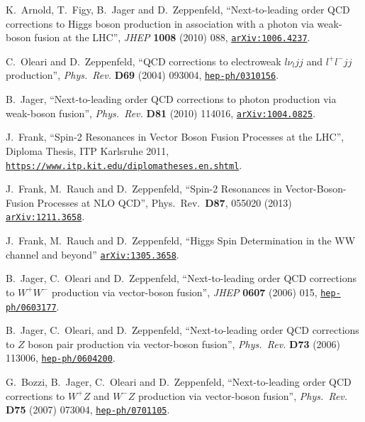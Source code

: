 \documentclass[english,12pt]{article}
\begin{document}
\begin{thebibliography}{10}
  K.~Arnold, T.~Figy, B.~Jager and D.~Zeppenfeld,
  ``Next-to-leading order QCD corrections to Higgs boson production in
  association with a photon via weak-boson fusion at the LHC'',
  {\em JHEP} {\bf 1008} (2010) 088,
\href{https://www.arXiv.org/abs/1006.4237}{{\tt arXiv:1006.4237}}.

C.~Oleari and D.~Zeppenfeld, ``QCD corrections to electroweak $l\nu_ljj$
and $l^+l^-jj$ production'', {\em Phys.\ Rev.} {\bf D69} (2004)
  093004,
\href{https://www.arXiv.org/abs/hep-ph/0310156}{{\tt hep-ph/0310156}}.

  B.~Jager,
  ``Next-to-leading order QCD corrections to photon production via weak-boson
  fusion'',
  {\em Phys.\ Rev.} {\bf D81} (2010) 114016,
 \href{https://arxiv.org/abs/1004.0825}{{\tt arXiv:1004.0825}}. 
  
J.~Frank, ``Spin-2 Resonances in Vector Boson Fusion Processes at the LHC'', 
{Diploma Thesis, ITP Karlsruhe 2011}, 
\href{https://www.itp.kit.edu/diplomatheses.en.shtml}{{\tt https://www.itp.kit.edu/diplomatheses.en.shtml}}.

  J.~Frank, M.~Rauch and D.~Zeppenfeld,
  ``Spin-2 Resonances in Vector-Boson-Fusion Processes at NLO QCD'',
  Phys.\ Rev.\ {\bf D87}, 055020 (2013)
 \href{https://arxiv.org/abs/1211.3658}{{\tt arXiv:1211.3658}}. 
  
  J.~Frank, M.~Rauch and D.~Zeppenfeld,
  ``Higgs Spin Determination in the WW channel and beyond''
 \href{https://arxiv.org/abs/1305.3658}{{\tt arXiv:1305.3658}}. 

B.~Jager, C.~Oleari and D.~Zeppenfeld, ``Next-to-leading order QCD corrections
  to $W^+ W^-$ production via vector-boson fusion'', {\em JHEP} {\bf 0607} 
(2006) 015,
\href{https://www.arXiv.org/abs/hep-ph/0603177}{{\tt hep-ph/0603177}}.

B.~Jager, C.~Oleari, and D.~Zeppenfeld, ``Next-to-leading order QCD corrections
  to $Z$ boson pair production via vector-boson fusion'', {\em Phys.\ Rev.} {\bf
  D73} (2006) 113006,
\href{https://www.arXiv.org/abs/hep-ph/0604200}{{\tt hep-ph/0604200}}.

G.~Bozzi, B.~Jager, C.~Oleari and D.~Zeppenfeld, ``Next-to-leading order QCD
  corrections to $W^+Z$ and $W^-Z$ production via vector-boson 
fusion'', {\em Phys.\ Rev.} {\bf D75} (2007) 073004,
\href{https://www.arXiv.org/abs/hep-ph/0701105}{{\tt hep-ph/0701105}}.


\end{thebibliography}
\end{document}
